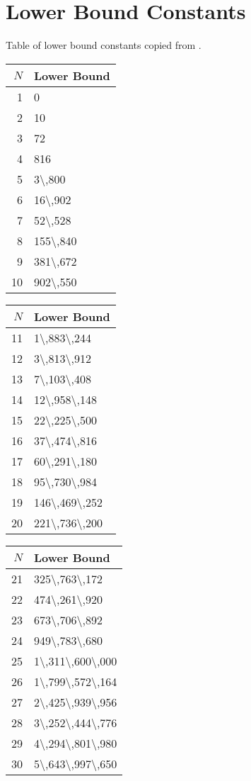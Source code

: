 \section{Lower Bound Constants}%
Table of lower bound constants copied from \cite{zimmermann}.
\label{sec:lower_bound_constants}
\begin{center}
\begin{tabular}{r|l}
  $N$ & Lower Bound\\\hline
  1 &\num{0}\\
  2 &\num{10}\\
  3 &\num{72}\\
  4 &\num{816}\\
  5 &\num{3\,800}\\
  6 &\num{16\,902}\\
  7 &\num{52\,528}\\
  8 &\num{155\,840}\\
  9 &\num{381\,672}\\
  10 &\num{902\,550}\\
\end{tabular}
\begin{tabular}{r|l}
  $N$ & Lower Bound\\\hline
  11 &\num{1\,883\,244}\\
  12 &\num{3\,813\,912}\\
  13 &\num{7\,103\,408}\\
  14 &\num{12\,958\,148}\\
  15 &\num{22\,225\,500}\\
  16 &\num{37\,474\,816}\\
  17 &\num{60\,291\,180}\\
  18 &\num{95\,730\,984}\\
  19 &\num{146\,469\,252}\\
  20 &\num{221\,736\,200}\\
\end{tabular}
\begin{tabular}{r|l}
  $N$ & Lower Bound\\\hline
  21 &\num{325\,763\,172}\\
  22 &\num{474\,261\,920}\\
  23 &\num{673\,706\,892}\\
  24 &\num{949\,783\,680}\\
  25 &\num{1\,311\,600\,000}\\
  26 &\num{1\,799\,572\,164}\\
  27 &\num{2\,425\,939\,956}\\
  28 &\num{3\,252\,444\,776}\\
  29 &\num{4\,294\,801\,980}\\
  30 &\num{5\,643\,997\,650}
\end{tabular}
\end{center}
